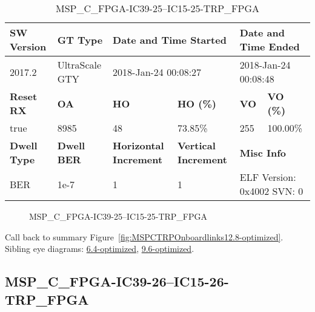 \begin{table}[h]
\centering
\caption{MSP\_C\_FPGA-IC39-25--IC15-25-TRP\_FPGA}
\label{tab:MSPCFPGAIC3925IC1525TRPFPGA12.8-optimized}
\begin{tabular}{@{}|l|l|l|l|l|l|@{}}
\toprule
\textbf{SW Version}                & \textbf{GT Type}   & \multicolumn{2}{l|}{\textbf{Date and Time Started}}            & \multicolumn{2}{l|}{\textbf{Date and Time Ended}}        \\ \midrule
2017.2                       & UltraScale GTY          & \multicolumn{2}{l|}{2018-Jan-24 00:08:27}                   & \multicolumn{2}{l|}{2018-Jan-24 00:08:48}               \\ \midrule
\textbf{Reset RX}                  & \textbf{OA} & \textbf{HO}   & \textbf{HO (\%)} & \textbf{VO} & \textbf{VO (\%)} \\ \midrule
true & 8985        & 48          & 73.85\%        & 255        & 100.00\%       \\ \midrule
\textbf{Dwell Type}                & \textbf{Dwell BER} & \textbf{Horizontal Increment} & \textbf{Vertical Increment}    & \multicolumn{2}{l|}{\textbf{Misc Info}}                  \\ \midrule
BER                            & 1e-7        & 1        & 1           & \multicolumn{2}{l|}{ELF Version: 0x4002 SVN: 0}                         \\ \bottomrule
\end{tabular}
\end{table}

\begin{figure}[h]
\caption{MSP\_C\_FPGA-IC39-25--IC15-25-TRP\_FPGA} \label{fig:MSPCFPGAIC3925IC1525TRPFPGA12.8-optimized}
\end{figure}

Call back to summary Figure~\ref{fig:MSPCTRPOnboardlinks12.8-optimized}.
Sibling eye diagrams: \hyperref[sec:MSPCFPGAIC3925IC1525TRPFPGA6.4-optimized]{6.4-optimized}, \hyperref[sec:MSPCFPGAIC3925IC1525TRPFPGA9.6-optimized]{9.6-optimized}.

\clearpage
\newpage


\subsection{MSP\_C\_FPGA-IC39-26--IC15-26-TRP\_FPGA}\label{sec:MSPCFPGAIC3926IC1526TRPFPGA12.8-optimized}


